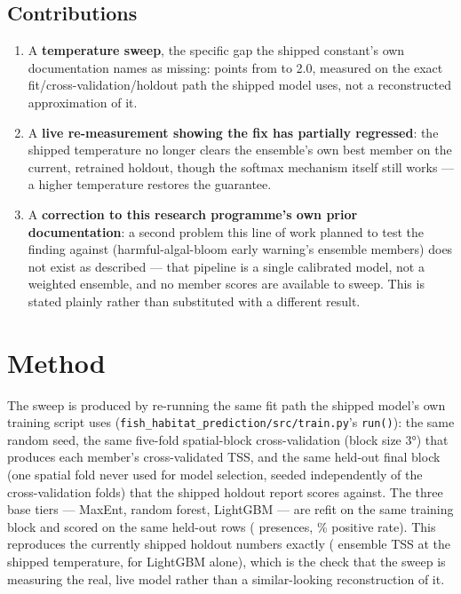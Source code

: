 \subsection{Contributions}

\begin{enumerate}\itemsep2pt
\item A \textbf{temperature sweep}, the specific gap the shipped constant's
own documentation names as missing: \NSweepPoints{} points from
\LowTemp{} to 2.0, measured on the exact fit/cross-validation/holdout path
the shipped model uses, not a reconstructed approximation of it.
\item A \textbf{live re-measurement showing the fix has partially regressed}:
the shipped temperature \ShippedTemperature{} no longer clears the
ensemble's own best member on the current, retrained holdout, though the
softmax mechanism itself still works --- a higher temperature restores the
guarantee.
\item A \textbf{correction to this research programme's own prior
documentation}: a second problem this line of work planned to test the
finding against (harmful-algal-bloom early warning's ensemble members) does
not exist as described --- that pipeline is a single calibrated model, not
a weighted ensemble, and no member scores are available to sweep. This is
stated plainly rather than substituted with a different result.
\end{enumerate}

\section{Method}
\label{sec:method}

 The sweep is produced by re-running the
same fit path the shipped model's own training script uses
(\texttt{fish\_habitat\_prediction/src/\allowbreak{}train.py}'s \texttt{run()}): the same
random seed, the same five-fold spatial-block cross-validation (block size
3\si{\degree}) that produces each member's cross-validated TSS, and the
same held-out final block (one spatial fold never used for model selection,
seeded independently of the cross-validation folds) that the shipped
holdout report scores against. The three base tiers --- MaxEnt, random
forest, LightGBM --- are refit on the same training block and scored on the
same \NHoldout{} held-out rows (\NHoldoutPos{} presences,
\HoldoutPosRate{}\% positive rate). This reproduces the currently shipped
holdout numbers exactly (\CurShippedTSS{} ensemble TSS at the shipped
temperature, \CurLgbmHoldoutTSS{} for LightGBM alone), which is the check
that the sweep is measuring the real, live model rather than a
similar-looking reconstruction of it.

